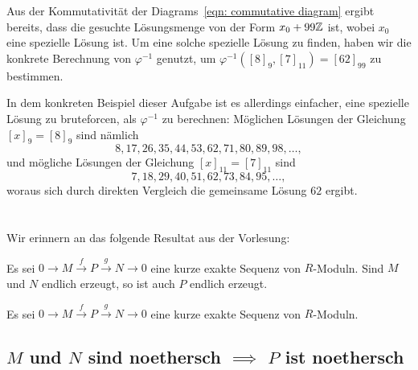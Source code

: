 \documentclass[a4paper,10pt,numbers=noenddot]{scrartcl}
\begin{document}
\begin{remark}
  Aus der Kommutativität der Diagrams~\eqref{eqn: commutative diagram} ergibt bereits, dass die gesuchte Lösungsmenge von der Form $x_0 + 99\mathbb{Z}$ ist, wobei $x_0$ eine spezielle Lösung ist.
  Um eine solche spezielle Lösung zu finden, haben wir die konkrete Berechnung von $\varphi^{-1}$ genutzt, um $\varphi^{-1}([8]_9, [7]_{11}) = [62]_{99}$ zu bestimmen.
  
  In dem konkreten Beispiel dieser Aufgabe ist es allerdings einfacher, eine spezielle Lösung zu bruteforcen, als $\varphi^{-1}$ zu berechnen:
  Möglichen Lösungen der Gleichung $[x]_9 = [8]_9$ sind nämlich
  \[
    8, 17, 26, 35, 44, 53, 62, 71, 80, 89, 98, \dotsc,
  \]
  und mögliche Lösungen der Gleichung $[x]_{11} = [7]_{11}$ sind
  \[
    7, 18, 29, 40, 51, 62, 73, 84, 95, \dotsc,
  \]
  woraus sich durch direkten Vergleich die gemeinsame Lösung $62$ ergibt.
\end{remark}






















\addtocounter{section}{3}





\section{}

Wir erinnern an das folgende Resultat aus der Vorlesung:

\begin{lemma}
  \label{lem: finitely generated and short exact sequences}
  Es sei $0 \to M \xrightarrow{f} P \xrightarrow{g} N \to 0$ eine kurze exakte Sequenz von $R$-Moduln.
  Sind $M$ und $N$ endlich erzeugt, so ist auch $P$ endlich erzeugt.
\end{lemma}

Es sei $0 \to M \xrightarrow{f} P \xrightarrow{g} N \to 0$ eine kurze exakte Sequenz von $R$-Moduln.



\subsection*{$M$ und $N$ sind noethersch $\implies$ $P$ ist noethersch}
\end{document}
